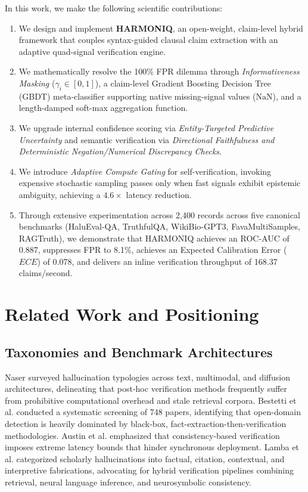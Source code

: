 \documentclass[conference]{IEEEtran}
\begin{document}
In this work, we make the following scientific contributions:
\begin{enumerate}
    \item We design and implement \textbf{HARMONIQ}, an open-weight, claim-level hybrid framework that couples syntax-guided clausal claim extraction with an adaptive quad-signal verification engine.
    \item We mathematically resolve the 100\% FPR dilemma through \textit{Informativeness Masking} ($\gamma_i \in [0, 1]$), a claim-level Gradient Boosting Decision Tree (GBDT) meta-classifier supporting native missing-signal values ($\mathrm{NaN}$), and a length-damped soft-max aggregation function.
    \item We upgrade internal confidence scoring via \textit{Entity-Targeted Predictive Uncertainty} and semantic verification via \textit{Directional Faithfulness and Deterministic Negation/Numerical Discrepancy Checks}.
    \item We introduce \textit{Adaptive Compute Gating} for self-verification, invoking expensive stochastic sampling passes only when fast signals exhibit epistemic ambiguity, achieving a $4.6\times$ latency reduction.
    \item Through extensive experimentation across 2,400 records across five canonical benchmarks (HaluEval-QA, TruthfulQA, WikiBio-GPT3, FavaMultiSamples, RAGTruth), we demonstrate that HARMONIQ achieves an ROC-AUC of 0.887, suppresses FPR to 8.1\%, achieves an Expected Calibration Error ($ECE$) of 0.078, and delivers an inline verification throughput of 168.37 claims/second.
\end{enumerate}

\section{Related Work and Positioning}

\subsection{Taxonomies and Benchmark Architectures}
Naser \cite{b6} surveyed hallucination typologies across text, multimodal, and diffusion architectures, delineating that post-hoc verification methods frequently suffer from prohibitive computational overhead and stale retrieval corpora. Bestetti et al. \cite{b7} conducted a systematic screening of 748 papers, identifying that open-domain detection is heavily dominated by black-box, fact-extraction-then-verification methodologies. Austin et al. \cite{b8} emphasized that consistency-based verification imposes extreme latency bounds that hinder synchronous deployment. Lamba et al. \cite{b3} categorized scholarly hallucinations into factual, citation, contextual, and interpretive fabrications, advocating for hybrid verification pipelines combining retrieval, neural language inference, and neurosymbolic consistency.
\end{document}
